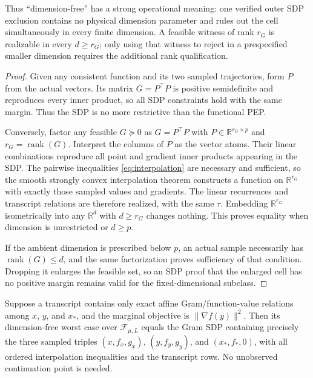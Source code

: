\documentclass[smallextended]{svjour3}
\newcommand{\R}{\mathbb{R}}
\newcommand{\cF}{\mathcal{F}}
\newcommand{\norm}[1]{\lVert #1\rVert}
\DeclareMathOperator{\rank}{rank}
\begin{document}
Thus ``dimension-free'' has a strong operational meaning: one verified outer
SDP exclusion contains no physical dimension parameter and rules out the cell
simultaneously in every finite dimension.  A feasible witness of rank $r_G$ is
realizable in every $d\geq r_G$; only using that witness to reject in a
prespecified smaller dimension requires the additional rank qualification.

\begin{proof}
Given any consistent function and its two sampled trajectories, form $P$ from
the actual vectors.  Its matrix $G=P^\top P$ is positive semidefinite and
reproduces every inner product, so all SDP constraints hold with the same
margin.  Thus the SDP is no more restrictive than the functional PEP.

Conversely, factor any feasible $G\succeq0$ as $G=P^\top P$ with
$P\in\R^{r_G\times p}$ and $r_G=\rank(G)$.  Interpret the columns of $P$ as
the vector atoms.  Their linear combinations reproduce all point and gradient
inner products appearing in the SDP.  The pairwise inequalities
\eqref{eq:interpolation} are necessary and sufficient, so the smooth strongly
convex interpolation theorem constructs a function on $\R^{r_G}$ with exactly
those sampled values and gradients.  The linear recurrences and transcript
relations are therefore realized, with the same $\tau$.  Embedding
$\R^{r_G}$ isometrically into any $\R^d$ with $d\geq r_G$ changes nothing.
This proves equality when dimension is unrestricted or $d\geq p$.

If the ambient dimension is prescribed below $p$, an actual sample necessarily
has $\rank(G)\leq d$, and the same factorization proves sufficiency of that
condition.  Dropping it enlarges the feasible set, so an SDP proof that the
enlarged cell has no positive margin remains valid for the fixed-dimensional
subclass.
\end{proof}

\begin{lemma}
\label{lem:three-point-marginal}
Suppose a transcript contains only exact affine Gram/function-value relations
among $x$, $y$, and $x_*$, and the marginal objective is
$\norm{\nabla f(y)}^2$.  Then its dimension-free worst case over
$\cF_{\mu,L}$ equals the Gram SDP containing precisely the three sampled
triples $(x,f_x,g_x)$, $(y,f_y,g_y)$, and $(x_*,f_*,0)$, with all ordered
interpolation inequalities and the transcript rows.  No unobserved continuation
point is needed.
\end{lemma}
\end{document}

